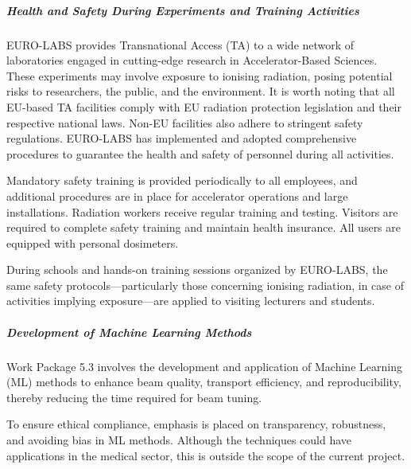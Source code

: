 
\subparagraph{Health and Safety During Experiments and Training Activities} \mbox{}


EURO-LABS provides Transnational Access (TA) to a wide network of laboratories engaged in cutting-edge research in Accelerator-Based Sciences. These experiments may involve exposure to ionising radiation, posing potential risks to researchers, the public, and the environment. It is worth noting that all EU-based TA facilities comply with EU radiation protection legislation and their respective national laws. Non-EU facilities also adhere to stringent safety regulations. EURO-LABS has implemented and adopted comprehensive procedures to guarantee the health and safety of personnel during all activities.

Mandatory safety training is provided periodically to all employees, and additional procedures are in place for accelerator operations and large installations. Radiation workers receive regular training and testing. Visitors are required to complete safety training and maintain health insurance. All users are equipped with personal dosimeters.

During schools and hands-on training sessions organized by EURO-LABS, the same safety protocols—particularly those concerning ionising radiation, in case of activities implying exposure—are applied to visiting lecturers and students.

\subparagraph{Development of Machine Learning Methods} \mbox{}

Work Package 5.3 involves the development and application of Machine Learning (ML) methods to enhance beam quality, transport efficiency, and reproducibility, thereby reducing the time required for beam tuning.

To ensure ethical compliance, emphasis is placed on transparency, robustness, and avoiding bias in ML methods. Although the techniques could have applications in the medical sector, this is outside the scope of the current project.

